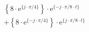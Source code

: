 \correct
\[
\begin{split}
&  \left \{ 8 \cdot \textrm{e}^{\{  j \cdot \pi/4 \}} \right \} \cdot \textrm{e}^{ \{ -j \cdot \pi/8 \cdot t \} }\\
&+ \left \{ 8 \cdot \textrm{e}^{\{ -j \cdot \pi/4 \}} \right \} \cdot \textrm{e}^{ \{  j \cdot \pi/8 \cdot t \} }
\end{split}
\]
